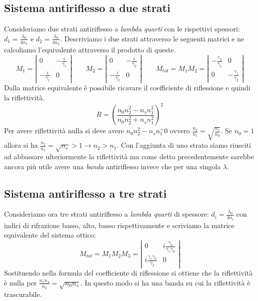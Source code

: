 \documentclass{article}
\begin{document}
\subsection{Sistema antiriflesso a due strati}
Consideriamo due strati antiriflesso a \textit{lambda quarti} con le rispettivi spessori: $d_1 = \frac{\lambda_0}{4n_1}$ e $d_2 = \frac{\lambda_0}{4n_2}$.
Descriviamo i due strati attraverso le seguenti matrici e ne calcoliamo l'equivalente attraverso il prodotto di queste.
\[
M_1 = \left| \begin{array}{cc}
0 & -\frac{i}{\gamma_1} \\
-\frac{i}{\gamma_1} & 0
\end{array} \right|
\qquad
M_2 = \left| \begin{array}{cc}
0 & -\frac{i}{\gamma_2} \\
-\frac{i}{\gamma_2} & 0
\end{array} \right|
\qquad
M_{tot} = M_1 M_2 = \left| \begin{array}{cc}
-\frac{\gamma_2}{\gamma_1} & 0 \\
0 & -\frac{\gamma_1}{\gamma_2}
\end{array} \right|
\]
Dalla matrice equivalente è possibile ricavare il coefficiente di riflessione e quindi la riflettività.
\begin{equation}
R = \left( \frac{n_0 n_2^2 - n_s n_1^2}{n_0 n_2^2 + n_s n_1^2} \right)^2
\end{equation}
Per avere riflettività nulla si deve avere $n_0 n_2^2 - n_s n_1^ = 0$ ovvero $\frac{n_2}{n_1} = \sqrt{\frac{n_s}{n_0}}$. Se $n_0 = 1$ allora si ha $\frac{n_2}{n_1} = \sqrt{n_s} > 1 \rightarrow n_2 > n_1$. Con l'aggiunta di uno strato siamo riusciti ad abbassare ulteriormente la riflettività ma come detto precedentemente sarebbe ancora più utile avere una \textit{banda} antiriflesso invece che per una singola $\lambda$.

\subsection{Sistema antiriflesso a tre strati}
Consideriamo ora tre strati antiriflesso a \textit{lambda quarti} di spessore: $d_i = \frac{\lambda_0}{4n_i}$ con indici di rifrazione basso, alto, basso rispettivamente e scriviamo la matrice equivalente del sistema ottico:
\[
M_{tot} = M_1 M_2 M_3 = \left| \begin{array}{cc}
0 & i\frac{\gamma_2}{\gamma_1 \gamma_3} \\
i\frac{\gamma_1 \gamma_3}{\gamma_2} & 0
\end{array} \right|
\]
Sostituendo nella formula del coefficiente di riflessione si ottiene che la riflettività è nulla per $\frac{n_1 n_3}{n_2} = \sqrt{n_0 n_s}$.
In questo modo si ha una banda su cui la riflettività è trascurabile.
\end{document}
